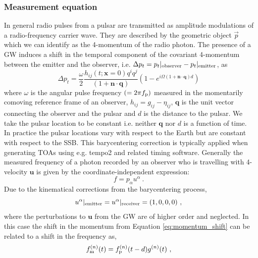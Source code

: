 \documentclass[fleqn,usenatbib,useAMS]{mnras}
\begin{document}
\subsubsection{Measurement equation}
In general radio pulses from a pulsar are transmitted as amplitude modulations of a radio-frequency carrier wave. They are described by the geometric object $\vec{p}$ which we can identify  as the 4-momentum of the radio photon. The presence of a GW induces a shift in the temporal component of the covariant 4-momentum between the emitter and the observer, i.e. $\Delta p_t = p_t|_{\rm observer} - p_t|_{\rm emitter} $, as \citep[e.g.][]{Maggiore}
\begin{equation}
 \Delta p_t = \frac{\omega}{2} \frac{ h_{ij} (t; \boldsymbol{x}= 0)q^i q^j }{(1 + \boldsymbol{n}\cdot \boldsymbol{q}) }  \left(1 -e^{i \Omega (1 + \boldsymbol{n}\cdot \boldsymbol{q})  d}\right)
	\label{eq:momentum_shift}
\end{equation}
where $\omega$ is the angular pulse frequency $(= 2 \pi f_{\rm p})$ measured in the momentarily comoving reference frame of an observer, $h_{ij} = g_{ij} - \eta_{ij}$, $\boldsymbol{q}$ is the unit vector connecting the observer and the pulsar and $d$ is the distance to the pulsar. We take the pulsar location to be constant i.e.  neither $\boldsymbol{q}$ nor $d$ is a function of time. In practice the pulsar locations vary with respect to the Earth but are constant with respect to the SSB. This barycentering correction is typically applied when generating TOAs using e.g. {\sc tempo2} \citep{tempo2} and related timing software. Generally the measured frequency of a photon recorded by an observer who is travelling with 4-velocity $\boldsymbol{u}$ is given by the coordinate-independent expression:
\begin{equation}
	f = p_{\alpha} u^{\alpha} \ . 
	\label{eq:freq_temporal}
\end{equation}
Due to the kinematical corrections from the barycentering process, 
\begin{equation}
	u^{\alpha}|_{\rm emitter} = u^{\alpha}|_{\rm receiver} = (1,0,0,0) \ ,
\end{equation}
where the perturbations to $\boldsymbol{u}$ from the GW are of higher order and neglected. In this case the shift in the momentum from Equation \eqref{eq:momentum_shift} can be related to a shift in the frequency as,
\begin{equation}
	f_{\rm m}^{(n)}(t) = f_{\rm p}^{(n)}(t-d) g^{(n)}(t) \ ,
	\label{eq:measurement}
\end{equation}
\end{document}
